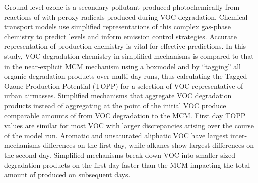 Ground-level ozone is a secondary pollutant produced photochemically from reactions of  with peroxy radicals produced during VOC degradation. 
Chemical transport models use simplified representations of this complex gas-phase chemistry to predict  levels and inform emission control strategies. 
Accurate representation of  production chemistry is vital for effective predictions.
In this study, VOC degradation chemistry in simplified mechanisms is compared to that in the near-explicit MCM mechanism using a boxmodel and by ``tagging'' all organic degradation products over multi-day runs, thus calculating the Tagged Ozone Production Potential (TOPP) for a selection of VOC representative of urban airmasses.
Simplified mechanisms that aggregate VOC degradation products instead of aggregating at the point of the initial VOC produce comparable amounts of  from VOC degradation to the MCM.
First day TOPP values are similar for most VOC with larger discrepancies arising over the course of the model run.
Aromatic and unsaturated aliphatic VOC have largest inter-mechanisms differences on the first day, while alkanes show largest differences on the second day.
Simplified mechanisms break down VOC into smaller sized degradation products on the first day faster than the MCM impacting the total amount of  produced on subsequent days.
